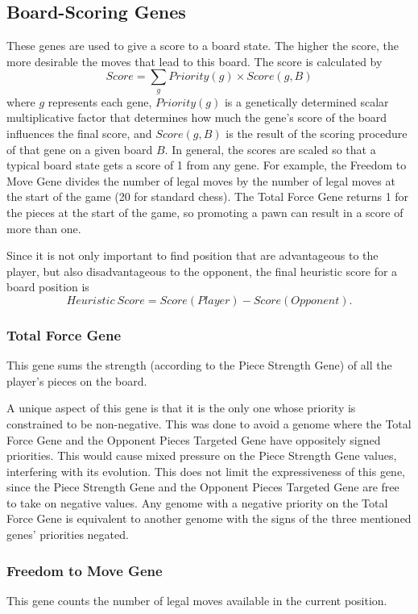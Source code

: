 \documentclass[letterpaper]{article}
\renewcommand\_{\textunderscore\allowbreak}
\begin{document}
\subsection{Board-Scoring Genes}
These genes are used to give a score to a board state. The higher the score, the more desirable the moves that lead to this board. The score is calculated by
\[Score = \sum_g Priority(g) \times Score(g,B)\]
where \(g\) represents each gene, \(Priority(g)\) is a genetically determined scalar multiplicative factor that determines how much the gene's score of the board influences the final score, and \(Score(g,B)\) is the result of the scoring procedure of that gene on a given board \(B\). In general, the scores are scaled so that a typical board state gets a score of 1 from any gene. For example, the Freedom to Move Gene divides the number of legal moves by the number of legal moves at the start of the game (20 for standard chess). The Total Force Gene returns 1 for the pieces at the start of the game, so promoting a pawn can result in a score of more than one.

Since it is not only important to find position that are advantageous to the player, but also disadvantageous to the opponent, the final heuristic score for a board position is
\[Heuristic\ Score = Score(Player) - Score(Opponent).\]

\subsubsection{Total Force Gene}
\label{total-force}
This gene sums the strength (according to the Piece Strength Gene) of all the player's pieces on the board.

A unique aspect of this gene is that it is the only one whose priority is constrained to be non-negative. This was done to avoid a genome where the Total Force Gene and the Opponent Pieces Targeted Gene have oppositely signed priorities. This would cause mixed pressure on the Piece Strength Gene values, interfering with its evolution. This does not limit the expressiveness of this gene, since the Piece Strength Gene and the Opponent Pieces Targeted Gene are free to take on negative values. Any genome with a negative priority on the Total Force Gene is equivalent to another genome with the signs of the three mentioned genes' priorities negated.

\subsubsection{Freedom to Move Gene}
This gene counts the number of legal moves available in the current position.
\end{document}
